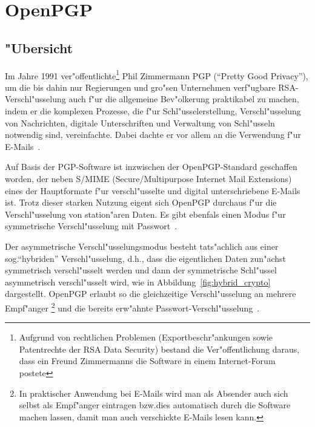 \documentclass[12pt]{article}
\begin{document}
\section{OpenPGP}
\subsection{"Ubersicht}

Im Jahre 1991 ver"offentlichte\footnote{Aufgrund von rechtlichen Problemen
(Exportbeschr"ankungen sowie Patentrechte der RSA Data Security) bestand die Ver"offentlichung daraus,
dass ein Freund Zimmermanns die Software in einem Internet-Forum postete}
Phil Zimmermann PGP ("`Pretty Good Privacy"'),
um die bis dahin nur Regierungen und gro"sen Unternehmen verf"ugbare RSA-Ver\-schl"us\-se\-lung
auch f"ur die allgemeine Bev"olkerung praktikabel zu machen,
indem er die komplexen Prozesse, die f"ur Schl"usselerstellung,
Verschl"usselung von Nachrichten, digitale Unterschriften und Verwaltung von Schl"usseln
notwendig sind, vereinfachte.
Dabei dachte er vor allem an die Verwendung f"ur E-Mails~\cite{singh}.

Auf Basis der PGP-Software ist inzwischen der OpenPGP-Standard geschaffen worden,
der neben S/MIME (Secure/Multipurpose Internet Mail Extensions)
eines der Hauptformate f"ur verschl"usselte und digital unterschriebene E-Mails ist.
Trotz dieser starken Nutzung eigent sich OpenPGP durchaus f"ur die Verschl"usselung
von station"aren Daten.
Es gibt ebenfals einen Modus f"ur symmetrische Verschl"usselung mit Passwort~\cite{rfc4480}.

Der asymmetrische Verschl"usselungsmodus besteht tats"achlich aus einer sog.\@ "`hybriden"'
Verschl"usselung, d.h.\@, dass die eigentlichen Daten zun"achst symmetrisch ver\-schl"us\-selt werden
und dann der symmetrische Schl"ussel asymmetrisch ver\-schl"us\-selt wird,
wie in Abbildung~\ref{fig:hybrid_crypto} dargestellt.
OpenPGP erlaubt so die gleichzeitige Verschl"usselung an mehrere Empf"anger%
\footnote{In praktischer Anwendung bei E-Mails wird man als Absender auch sich selbst
als Empf"anger eintragen bzw.\@ dies automatisch durch die Software machen lassen,
damit man auch verschickte E-Mails lesen kann.}
und die bereits erw"ahnte Passwort-Ver\-schl"us\-se\-lung~\cite{rfc4480}.
\end{document}
